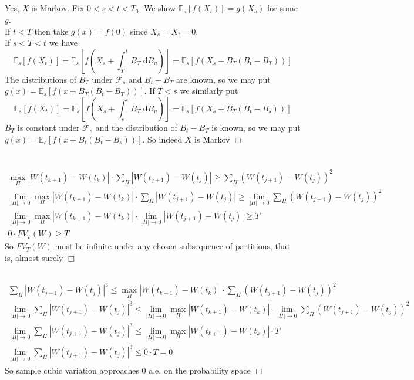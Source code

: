 \documentclass{article}
\begin{document}
\subsection{}
Yes, $X$ is Markov. Fix $0 < s < t < T_0$. We show $\mathbb{E}_s[f(X_t)] = g(X_s)$ for some $g$.\\
If $t < T$ then take $g(x) = f(0)$ since $X_s = X_t = 0$.\\
If $s < T < t$ we have
$$\mathbb{E}_s[f(X_t)]= \mathbb{E}_s[f(X_s + \int_T^t B_T \;\mathrm{d}B_u)] = \mathbb{E}_s[f(X_s + B_T(B_t - B_T))]$$
The distributions of $B_T$ under $\mathcal{F}_s$ and $B_t - B_T$ are known, so we may put $g(x) = \mathbb{E}_s[f(x + B_T(B_t - B_T))]$.
If $T < s$ we similarly put
$$\mathbb{E}_s[f(X_t)]= \mathbb{E}_s[f(X_s + \int_s^t B_T \;\mathrm{d}B_u)] = \mathbb{E}_s[f(X_s + B_T(B_t - B_s))]$$
$B_T$ is constant under $\mathcal{F}_s$ and the distribution of $B_t - B_T$ is known, so we may put $g(x) = \mathbb{E}_s[f(x + B_t(B_t - B_s))]$. So indeed $X$ is Markov $\Box$

\section{}
\subsection{}
\begin{gather*}
\max_\Pi |W(t_{k+1}) - W(t_k)| \cdot \sum_\Pi |W(t_{j+1}) - W(t_j)| \geq \sum_\Pi (W(t_{j+1}) - W(t_j))^2 \\
\lim_{|\Pi| \to 0} \max_\Pi |W(t_{k+1}) - W(t_k)| \cdot \sum_\Pi |W(t_{j+1}) - W(t_j)| \geq \lim_{|\Pi| \to 0} \sum_\Pi (W(t_{j+1}) - W(t_j))^2\\
\lim_{|\Pi| \to 0} \max_\Pi |W(t_{k+1}) - W(t_k)| \cdot \lim_{|\Pi| \to 0} |W(t_{j+1}) - W(t_j)| \geq T\\
0 \cdot FV_T(W) \geq T
\end{gather*}
So $FV_T(W)$ must be infinite under any chosen subsequence of partitions, that is, almost surely $\Box$

\subsection{}
\begin{gather*}
\sum_\Pi |W(t_{j+1}) - W(t_j)|^3 \leq \max_\Pi |W(t_{k+1}) - W(t_k)| \cdot \sum_\Pi (W(t_{j+1}) - W(t_j))^2\\
\lim_{|\Pi| \to 0} \sum_\Pi |W(t_{j+1}) - W(t_j)|^3 \leq \lim_{|\Pi| \to 0} \max_\Pi |W(t_{k+1}) - W(t_k)| \cdot \lim_{|\Pi| \to 0} \sum_\Pi (W(t_{j+1}) - W(t_j))^2\\
\lim_{|\Pi| \to 0} \sum_\Pi |W(t_{j+1}) - W(t_j)|^3 \leq \lim_{|\Pi| \to 0} \max_\Pi |W(t_{k+1}) - W(t_k)| \cdot T\\
\lim_{|\Pi| \to 0} \sum_\Pi |W(t_{j+1}) - W(t_j)|^3 \leq 0 \cdot T = 0
\end{gather*}
So sample cubic variation approaches 0 a.e. on the probability space $\Box$
\end{document}
